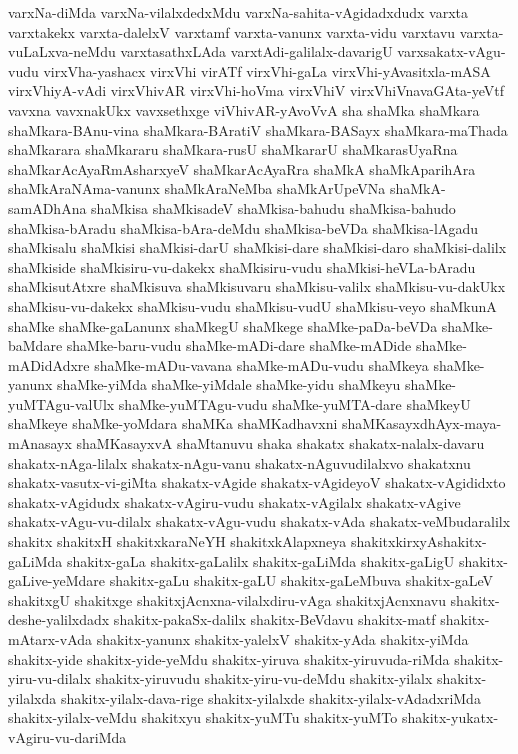 {varxNa-diMda
varxNa-vilalxdedxMdu
varxNa-sahita-vAgidadxdudx
varxta
varxtakekx
varxta-dalelxV
varxtamf
varxta-vanunx
varxta-vidu
varxtavu
varxta-vuLaLxva-neMdu
varxtasathxLAda
varxtAdi-galilalx-davarigU
varxsakatx-vAgu-vudu
virxVha-yashacx
virxVhi
virATf
virxVhi-gaLa
virxVhi-yAvasitxla-mASA
virxVhiyA-vAdi
virxVhivAR
virxVhi-hoVma
virxVhiV
virxVhiVnavaGAta-yeVtf
vavxna
vavxnakUkx
vavxsethxge
viVhivAR-yAvoVvA
sha
shaMka
shaMkara
shaMkara-BAnu-vina
shaMkara-BAratiV
shaMkara-BASayx
shaMkara-maThada
shaMkarara
shaMkararu
shaMkara-rusU
shaMkararU
shaMkarasUyaRna
shaMkarAcAyaRmAsharxyeV
shaMkarAcAyaRra
shaMkA
shaMkAparihAra
shaMkAraNAma-vanunx
shaMkAraNeMba
shaMkArUpeVNa
shaMkA-samADhAna
shaMkisa
shaMkisadeV
shaMkisa-bahudu
shaMkisa-bahudo
shaMkisa-bAradu
shaMkisa-bAra-deMdu
shaMkisa-beVDa
shaMkisa-lAgadu
shaMkisalu
shaMkisi
shaMkisi-darU
shaMkisi-dare
shaMkisi-daro
shaMkisi-dalilx
shaMkiside
shaMkisiru-vu-dakekx
shaMkisiru-vudu
shaMkisi-heVLa-bAradu
shaMkisutAtxre
shaMkisuva
shaMkisuvaru
shaMkisu-valilx
shaMkisu-vu-dakUkx
shaMkisu-vu-dakekx
shaMkisu-vudu
shaMkisu-vudU
shaMkisu-veyo
shaMkunA
shaMke
shaMke-gaLanunx
shaMkegU
shaMkege
shaMke-paDa-beVDa
shaMke-baMdare
shaMke-baru-vudu
shaMke-mADi-dare
shaMke-mADide
shaMke-mADidAdxre
shaMke-mADu-vavana
shaMke-mADu-vudu
shaMkeya
shaMke-yanunx
shaMke-yiMda
shaMke-yiMdale
shaMke-yidu
shaMkeyu
shaMke-yuMTAgu-valUlx
shaMke-yuMTAgu-vudu
shaMke-yuMTA-dare
shaMkeyU
shaMkeye
shaMke-yoMdara
shaMKa
shaMKadhavxni
shaMKasayxdhAyx-maya-mAnasayx
shaMKasayxvA
shaMtanuvu
shaka
shakatx
shakatx-nalalx-davaru
shakatx-nAga-lilalx
shakatx-nAgu-vanu
shakatx-nAguvudilalxvo
shakatxnu
shakatx-vasutx-vi-giMta
shakatx-vAgide
shakatx-vAgideyoV
shakatx-vAgididxto
shakatx-vAgidudx
shakatx-vAgiru-vudu
shakatx-vAgilalx
shakatx-vAgive
shakatx-vAgu-vu-dilalx
shakatx-vAgu-vudu
shakatx-vAda
shakatx-veMbudaralilx
shakitx
shakitxH
shakitxkaraNeYH
shakitxkAlapxneya
shakitxkirxyAshakitx-gaLiMda
shakitx-gaLa
shakitx-gaLalilx
shakitx-gaLiMda
shakitx-gaLigU
shakitx-gaLive-yeMdare
shakitx-gaLu
shakitx-gaLU
shakitx-gaLeMbuva
shakitx-gaLeV
shakitxgU
shakitxge
shakitxjAcnxna-vilalxdiru-vAga
shakitxjAcnxnavu
shakitx-deshe-yalilxdadx
shakitx-pakaSx-dalilx
shakitx-BeVdavu
shakitx-matf
shakitx-mAtarx-vAda
shakitx-yanunx
shakitx-yalelxV
shakitx-yAda
shakitx-yiMda
shakitx-yide
shakitx-yide-yeMdu
shakitx-yiruva
shakitx-yiruvuda-riMda
shakitx-yiru-vu-dilalx
shakitx-yiruvudu
shakitx-yiru-vu-deMdu
shakitx-yilalx
shakitx-yilalxda
shakitx-yilalx-dava-rige
shakitx-yilalxde
shakitx-yilalx-vAdadxriMda
shakitx-yilalx-veMdu
shakitxyu
shakitx-yuMTu
shakitx-yuMTo
shakitx-yukatx-vAgiru-vu-dariMda
}
